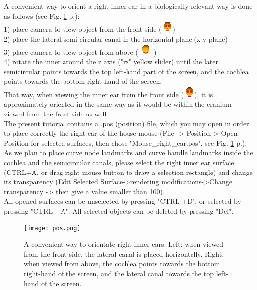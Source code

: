 \documentclass[12pt, a4paper]{book}
\begin{document}
A convenient way to orient a right inner ear in a biologically relevant way is done as follows (see Fig. \ref{orientation} p.\pageref{orientation}):\\
1) place camera to view object from the front side (\includegraphics[scale=0.7]{../images/06/camera/camera_front.png})\\
2) place the lateral semi-circular canal in the horizontal plane (x-y plane)\\
3) place camera  to view object from above ( \includegraphics[scale=0.7]{../images/06/camera/camera_above.png} )\\
4) rotate the inner around the z axis ("rz" yellow slider) until the later semicircular points towards the top left-hand part of the screen, and the cochlea points towards the bottom right-hand of the screen.\\
That way, when viewing the inner ear from the front side (\includegraphics[scale=0.7]{../images/06/camera/camera_front.png}), it is approximately oriented in the same way as it would be within the cranium viewed from the front side as well.\\

The present tutorial contains a .pos (position) file, which you may open in order to place correctly the right ear of the house
mouse (File -> Position-> Open Position for selected surfaces, then chose "Mouse\_right\_ear.pos", see Fig. \ref{orientation} p.\pageref{orientation}). As we plan to place curve node landmarks and curve handle landmarks inside the cochlea and the semicircular canals, please select the right inner ear surface (CTRL+A, or drag right mouse button to draw a selection rectangle) and change its transparency (Edit Selected Surface->rendering modifications->Change transparency -> then give a value smaller than 100).\\
All opened surfaces can be unselected by pressing "CTRL +D", or selected by pressing "CTRL +A". All selected objects can be deleted by pressing "Del".

\begin{figure}
  \centering
  \texttt{[image: pos.png]} 
	\caption{A convenient way to orientate right inner ears.  Left: when viewed from the front side, the lateral canal is placed horizontally. Right: when viewed from above, the cochlea points towards the bottom right-hand of the screen, and the lateral canal towards the top left-hand of the screen.}
\label{orientation}
 
\end{figure}
\end{document}
